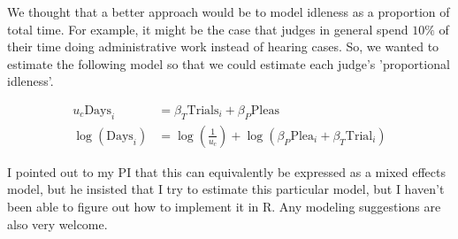 \documentclass[11pt]{article}
\begin{document}
  We thought that a better approach would be to model idleness as a proportion of total time. For example, it might be the case that judges in general spend $10\%$ of their time doing administrative work instead of hearing cases. So, we wanted to estimate the following model so that we could estimate each judge's 'proportional idleness'.

  \begin{align*}
    u_c \text{Days}_i &= \beta_T \text{Trials}_i + \beta_P \text{Pleas} \\
    \log(\text{Days}_i) &= \log(\frac{1}{u_c}) + \log(\beta_P \text{Plea}_i + \beta_T \text{Trial}_i)
  \end{align*}

  I pointed out to my PI that this can equivalently be expressed as a mixed effects model, but he insisted that I try to estimate this particular model, but I haven't been able to figure out how to implement it in R. Any modeling suggestions are also very welcome. 
\end{document}

